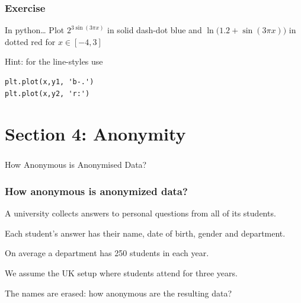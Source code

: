 \documentclass[dvips, %
               xcolor=pst,
               hyperref={colorlinks=false,
               dvips,
               citecolor=magenta,menucolor=cyan,
               bookmarks,bookmarksopen,pdfpagemode=UseThumbs}
              ]{beamer}
\renewcommand{\blue}{}}{\newcommand{\emphy}{}}
\begin{document}
\begin{frame}[fragile]\frametitle{Exercise}

\begin{block}{In python\ldots}
Plot $\blue 2^{3\sin(3\pi x)}$ in solid dash-dot blue and
$\blue \ln\big(1.2+\sin(3\pi x)\big)$ in dotted red for $\blue x\in[-4,3]$
\end{block}


Hint: for the line-styles use
\begin{verbatim}
plt.plot(x,y1, 'b-.')
plt.plot(x,y2, 'r:')
\end{verbatim}


\end{frame}

\section{Section 4: Anonymity}

\begin{frame}[fragile]\frametitle{}

\vfill
\begin{center}
\LARGE\blue

How Anonymous is Anonymised Data?

\end{center}
\vfill

\end{frame}



\begin{frame}[fragile]\frametitle{How anonymous is anonymized data?}

\pause\medskip
A university collects answers to personal questions from all of its students.

\pause\medskip
Each student's answer has their name, date of birth, gender and department.

\pause\medskip
On average a department has 250 students in each year.

\pause\medskip
We assume the UK setup where students attend for three years.

\pause\medskip
\alert{The names are erased: how anonymous are the resulting data?}

\end{frame}
\end{document}
